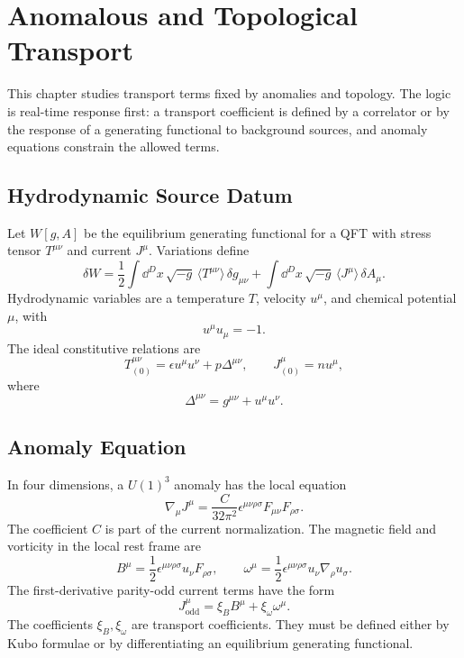 \chapter{Anomalous and Topological Transport}
\label{ch:thermal-anomalous-topological-transport}

\ConventionsMixed

This chapter studies transport terms fixed by anomalies and topology.  The
logic is real-time response first: a transport coefficient is defined by a
correlator or by the response of a generating functional to background
sources, and anomaly equations constrain the allowed terms.

\section{Hydrodynamic Source Datum}

Let \(W[g,A]\) be the equilibrium generating functional for a QFT with
stress tensor \(T^{\mu\nu}\) and current \(J^\mu\).  Variations define
\[
  \delta W
  =
  \frac12\int\dd^Dx\,\sqrt{-g}\,
  \langle T^{\mu\nu}\rangle\,\delta g_{\mu\nu}
  +
  \int\dd^Dx\,\sqrt{-g}\,
  \langle J^\mu\rangle\,\delta A_\mu .
\]
Hydrodynamic variables are a temperature \(T\), velocity \(u^\mu\), and
chemical potential \(\mu\), with
\[
  u^\mu u_\mu=-1.
\]
The ideal constitutive relations are
\[
  T^{\mu\nu}_{(0)}=\epsilon u^\mu u^\nu+p\Delta^{\mu\nu},\qquad
  J^\mu_{(0)}=n u^\mu,
\]
where
\[
  \Delta^{\mu\nu}=g^{\mu\nu}+u^\mu u^\nu .
\]

\section{Anomaly Equation}

In four dimensions, a \(U(1)^3\) anomaly has the local equation
\[
  \nabla_\mu J^\mu
  =
  \frac{C}{32\pi^2}
  \epsilon^{\mu\nu\rho\sigma}F_{\mu\nu}F_{\rho\sigma}.
\]
The coefficient \(C\) is part of the current normalization.  The magnetic
field and vorticity in the local rest frame are
\[
  B^\mu=\frac12\epsilon^{\mu\nu\rho\sigma}u_\nu F_{\rho\sigma},
  \qquad
  \omega^\mu=\frac12\epsilon^{\mu\nu\rho\sigma}
  u_\nu\nabla_\rho u_\sigma .
\]
The first-derivative parity-odd current terms have the form
\[
  J^\mu_{\mathrm{odd}}
  =
  \xi_B B^\mu+\xi_\omega\omega^\mu .
\]
The coefficients \(\xi_B,\xi_\omega\) are transport coefficients.  They must
be defined either by Kubo formulae or by differentiating an equilibrium
generating functional.


